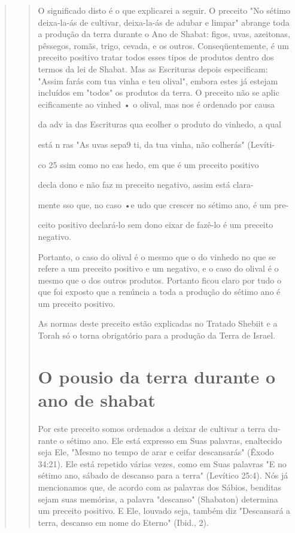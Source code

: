 \begin{quote}
\begin{quote}
O significado disto é o que explicarei a seguir. O preceito "No séti­mo
deixa-la-ás de cultivar, deixa-la-ás de adubar e limpar" abrange toda a
pro­dução da terra durante o Ano de Shabat: figos, uvas, azeitonas,
pêssegos, ro­mãs, trigo, cevada, e os outros. Conseqüentemente, é um
preceito positivo tra­tar todos esses tipos de produtos dentro dos
termos da lei de Shabat. Mas as Escrituras depois especificam: "Assim
farás com tua vinha e teu olival", embo­ra estes já estejam incluídos em
"todos" os produtos da terra. O preceito não se aplic ecificamente ao
vinhed • o olival, mas nos é ordenado por causa

da adv ia das Escrituras qua ecolher o produto do vinhedo, a qual

está n ras "As uvas sepa9 ti, da tua vinha, não colherás" (Levíti-

co 25 ssim como no cas hedo, em que é um preceito positivo

decla dono e não faz m preceito negativo, assim está clara-

mente sso que, no caso •e udo que crescer no sétimo ano, é um pre-

ceito positivo declará-lo sem dono eixar de fazê-lo é um preceito
negativo.

Portanto, o caso do olival é o mesmo que o do vinhedo no que se refere a
um preceito positivo e um negativo, e o caso do olival é o mesmo que o
dos outros produtos. Portanto ficou claro por tudo o que foi exposto que
a renúncia a toda a produção do sétimo ano é um preceito positivo.

As normas deste preceito estão explicadas no Tratado Shebiit e a To­rah
só o torna obrigatório para a produção da Terra de Israel.

\section{O pousio da terra durante o ano de shabat}

Por este preceito somos ordenados a deixar de cultivar a terra du­rante
o sétimo ano. Ele está expresso em Suas palavras, enaltecido seja Ele,
"Mes­mo no tempo de arar e ceifar descansarás" (Êxodo 34:21). Ele está
repetido vá­rias vezes, como em Suas palavras "E no sétimo ano, sábado
de descanso para a terra" (Levítico 25:4). Nós já mencionamos que, de
acordo com as palavras dos Sábios, benditas sejam suas memórias, a
palavra "descanso" (Shabaton) de­termina um preceito positivo. E Ele,
louvado seja, também diz "Descansará a terra, descanso em nome do
Eterno" (Ibid., 2).


\end{quote}
\end{quote}

